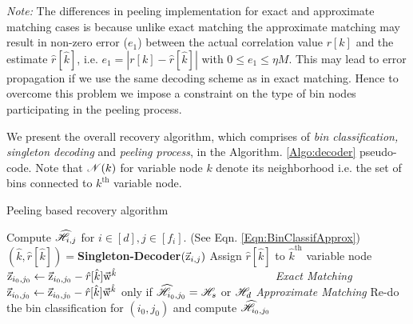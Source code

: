{\it Note:} The differences in peeling implementation for exact and approximate matching cases is because unlike exact matching the approximate matching may result in non-zero error ($e_1$) between the actual correlation value $r[k]$ and the estimate $\hat{r}[\hat{k}]$, i.e. $e_1 = |r[k]- \hat{r}[\hat{k}]|$ with $0 \leq e_1 \leq \eta M$. This may lead to error propagation if we use the same decoding scheme as in exact matching. Hence to overcome this problem we impose a constraint on the type of bin nodes participating in the peeling process.
	
We present the overall recovery algorithm, which comprises of {\it bin classification, singleton decoding} and {\it peeling process}, in the Algorithm. \ref{Algo:decoder} pseudo-code. Note that $\mathscr{N}(k)$ for variable node $k$ denote its neighborhood i.e. the set of bins connected to $k^{\text{th}}$ variable node.

\def\gap{4pt}
\begin{algorithm}[h!]
\caption{Peeling based recovery algorithm}
\label{Algo:decoder}
\begin{algorithmic}
\State Compute $\widehat{\mathscr{H}}_{i,j}$ for $i\in[d], j\in[f_i]$. (See Eqn. \eqref{Eqn:BinClassifApprox})
\vspace{\gap}
\vspace{\gap}
  \State $(\hat{k},\hat{r}[\hat{k}])=${\bf Singleton-Decoder}$(\vec{\mathrm{z}}_{i,j})$
\vspace{\gap}
  \State Assign $\hat{r}[\hat{k}]$ to $\hat{k}^{\text{th}}$ variable node
\vspace{1.5\gap}
\vspace{\gap}
	   \State $\zv_{i_0,j_0}\gets\zv_{i_0,j_0}-\hat{r}[\hat{k}]\wv^{\hat{k}} \hspace{32.0 ex}$ 
	      \hspace{45.5ex} {\it Exact Matching}
	   \vspace{\gap}
	   \State $\vec{\mathrm{z}}_{i_0,j_0}\gets\vec{\mathrm{z}}_{i_0,j_0}-\hat{r}[\hat{k}]\vec{\mathrm{w}}^{\hat{k}}$   \hspace{6ex} only if $\widehat{\mathscr{H}}_{i_0,j_0}=\mathscr{H}_s$ or $\mathscr{H}_d$ \hspace{14ex} {\it Approximate Matching}
	   \vspace{\gap}
	   \State Re-do the bin classification for $(i_0,j_0)$ and compute $\widehat{\mathscr{H}}_{i_0,j_0}$
      \EndFor
\EndWhile
\end{algorithmic}
\end{algorithm}

